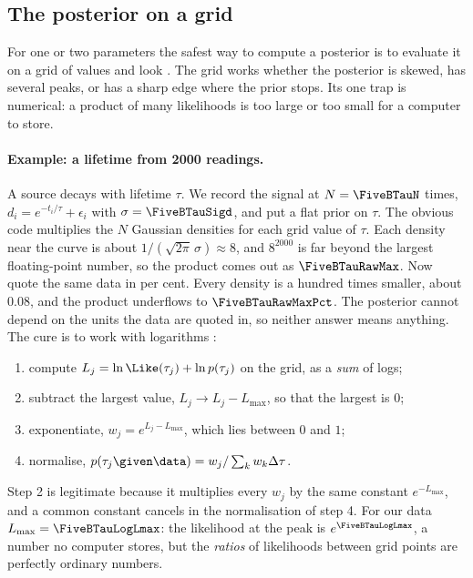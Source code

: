 \subsection{The posterior on a grid}

For one or two parameters the safest way to compute a posterior is to evaluate it on a
grid of values and look . The grid
works whether the posterior is skewed, has several peaks, or has a sharp edge where the
prior stops. Its one trap is numerical: a product of many likelihoods is too large or
too small for a computer to store.

\paragraph{Example: a lifetime from 2000 readings.}
A source decays with lifetime $\tau$. We record the signal at $N=\FiveBTauN$ times,
$d_i=e^{-t_i/\tau}+\epsilon_i$ with $\sigma=\FiveBTauSigd$, and put a flat prior on
$\tau$. The obvious code multiplies the $N$ Gaussian densities for each grid value of
$\tau$. Each density near the curve is about $1/(\sqrt{2\pi}\,\sigma)\approx8$, and
$8^{2000}$ is far beyond the largest floating-point number, so the product comes out
as $\FiveBTauRawMax$. Now quote the same data in per cent. Every density is a hundred
times smaller, about $0.08$, and the product underflows to $\FiveBTauRawMaxPct$. The
posterior cannot depend on the units the data are quoted in, so neither answer means
anything. The cure is to work with logarithms :
\begin{enumerate}
  \item compute $L_j=\ln\Like(\tau_j)+\ln p(\tau_j)$ on the grid, as a \emph{sum} of
        logs;
  \item subtract the largest value, $L_j\to L_j-L_{\max}$, so that the largest is $0$;
  \item exponentiate, $w_j=e^{L_j-L_{\max}}$, which lies between $0$ and $1$;
  \item normalise, $p(\tau_j\given\data)=w_j/\sum_kw_k\Delta\tau$.
\end{enumerate}
Step 2 is legitimate because it multiplies every $w_j$ by the same constant
$e^{-L_{\max}}$, and a common constant cancels in the normalisation of step 4. For our
data $L_{\max}=\FiveBTauLogLmax$: the likelihood at the peak is $e^{\FiveBTauLogLmax}$,
a number no computer stores, but the \emph{ratios} of likelihoods between grid points
are perfectly ordinary numbers.

